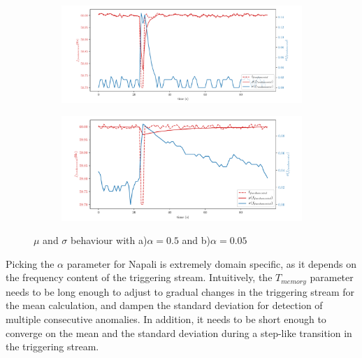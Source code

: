 \begin{figure}[ht!]
    \centering
    \begin{subfigure}{0.9\textwidth}
        \centering
        \includegraphics[width=1\linewidth]{img/napali_eval/Napali_response_freq_05.pdf}
        \caption{}
        \label{fig:expdes:5:1}
    \end{subfigure}%

    \begin{subfigure}{0.9\textwidth}
        \centering
        \includegraphics[width=1\linewidth]{img/napali_eval/Napali_response_freq_005.pdf}
        \caption{}
        \label{fig:expdes:5:2}
    \end{subfigure}
    \caption{$\mu$ and $\sigma$ behaviour with a)$\alpha = 0.5$ and b)$\alpha=0.05$}
    \label{fig:expdes:5}
\end{figure}

Picking the $\alpha$ parameter for Napali is extremely domain specific, as it depends on the frequency content of the triggering stream.
Intuitively, the $T_{memory}$ parameter needs to be long enough to adjust to gradual changes in the triggering stream for the mean calculation,
and dampen the standard deviation for detection of multiple consecutive anomalies.
In addition, it needs to be short enough to converge on the mean and the standard deviation during a step-like transition in the triggering stream.

